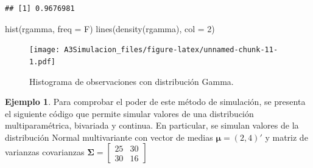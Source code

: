 \documentclass[
  10pt,
  spanish,
]{book}
\newenvironment{Shaded}{\begin{snugshade}}{\end{snugshade}}
\newcommand{\AttributeTok}[1]{\textcolor[rgb]{0.77,0.63,0.00}{#1}}
\newcommand{\DecValTok}[1]{\textcolor[rgb]{0.00,0.00,0.81}{#1}}
\newcommand{\FunctionTok}[1]{\textcolor[rgb]{0.00,0.00,0.00}{#1}}
\newcommand{\NormalTok}[1]{#1}
\theoremstyle{definition}
\theoremstyle{definition}
\newtheorem{example}{Ejemplo}[chapter]
\theoremstyle{definition}
\theoremstyle{definition}
\theoremstyle{remark}
\begin{document}
\begin{verbatim}
## [1] 0.9676981
\end{verbatim}

\begin{Shaded}
\begin{Highlighting}[]
\FunctionTok{hist}\NormalTok{(rgamma, }\AttributeTok{freq =}\NormalTok{ F)}
\FunctionTok{lines}\NormalTok{(}\FunctionTok{density}\NormalTok{(rgamma), }\AttributeTok{col =} \DecValTok{2}\NormalTok{)}
\end{Highlighting}
\end{Shaded}

\begin{figure}
\centering
\texttt{[image: A3Simulacion\_files/figure-latex/unnamed-chunk-11-1.pdf]}
\caption{\label{fig:unnamed-chunk-11}Histograma de observaciones con distribución Gamma.}
\end{figure}

\begin{example}
\protect\hypertarget{exm:unnamed-chunk-12}{}{\label{exm:unnamed-chunk-12} }Para comprobar el poder de este método de simulación, se presenta el siguiente código que permite simular valores de una distribución multiparamétrica, bivariada y continua. En particular, se simulan valores de la distribución Normal multivariante con vector de medias \(\boldsymbol \mu= (2, 4)'\) y matriz de varianzas covarianzas
\(\boldsymbol \Sigma= \begin{bmatrix} 25 & 30 \\ 30 & 16 \end{bmatrix}\)
\end{example}
\end{document}
